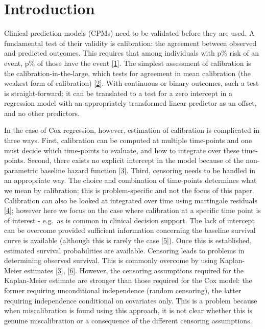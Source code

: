 \documentclass[12pt,PhD,twoside,openright]{muthesis}
\begin{document}
\hypertarget{introduction-4}{%
\section{Introduction}\label{introduction-4}}

Clinical prediction models (CPMs) need to be validated before they are used. A fundamental test of their validity is calibration: the agreement between observed and predicted outcomes. This requires that among individuals with p\% risk of an event, p\% of those have the event {[}\protect\hyperlink{ref-steyerberg_clinical_2008}{1}{]}. The simplest assessment of calibration is the calibration-in-the-large, which tests for agreement in mean calibration (the weakest form of calibration) {[}\protect\hyperlink{ref-calster_calibration_2016-1}{2}{]}. With continuous or binary outcomes, such a test is straight-forward: it can be translated to a test for a zero intercept in a regression model with an appropriately transformed linear predictor as an offset, and no other predictors.

In the case of Cox regression, however, estimation of calibration is complicated in three ways. First, calibration can be computed at multiple time-points and one must decide which time-points to evaluate, and how to integrate over these time-points. Second, there exists no explicit intercept in the model because of the non-parametric baseline hazard function {[}\protect\hyperlink{ref-royston_external_2013}{3}{]}. Third, censoring needs to be handled in an appropriate way. The choice and combination of time-points determines what we mean by calibration; this is problem-specific and not the focus of this paper. Calibration can also be looked at integrated over time using martingale residuals {[}\protect\hyperlink{ref-crowson_assessing_2016}{4}{]}; however here we focus on the case where calibration at a specific time point is of interest - e.g.~as is common in clinical decision support. The lack of intercept can be overcome provided sufficient information concerning the baseline survival curve is available (although this is rarely the case {[}\protect\hyperlink{ref-houwelingen_validation_2000}{5}{]}). Once this is established, estimated survival probabilities are available. Censoring leads to problems in determining observed survival. This is commonly overcome by using Kaplan-Meier estimates {[}\protect\hyperlink{ref-royston_external_2013}{3}{]}, {[}\protect\hyperlink{ref-hippisley-cox_derivation_2007}{6}{]}. However, the censoring assumptions required for the Kaplan-Meier estimate are stronger than those required for the Cox model: the former requiring unconditional independence (random censoring), the latter requiring independence conditional on covariates only. This is a problem because when miscalibration is found using this approach, it is not clear whether this is genuine miscalibration or a consequence of the different censoring assumptions.
\end{document}
